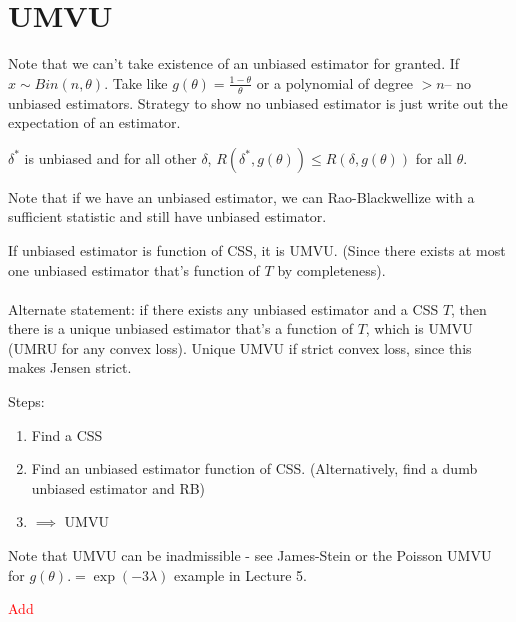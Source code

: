 \documentclass{article}
\newcommand\myworries[1]{\textcolor{red}{#1}}
\begin{document}
\section{UMVU}
Note that we can't take existence of an unbiased estimator for granted. If $x\sim Bin(n,\theta)$. Take like $g(\theta) = \frac{1-\theta}{\theta}$ or a polynomial of degree $>n$-- no unbiased estimators. Strategy to show no unbiased estimator is just write out the expectation of an estimator.
\begin{definition}[UMVU]
$\delta^*$ is unbiased and for all other $\delta$, $R(\delta^*,g(\theta)) \leq R(\delta,g(\theta))$ for all $\theta$.
\end{definition}
Note that if we have an unbiased estimator, we can Rao-Blackwellize with a sufficient statistic and still have unbiased estimator. 
\begin{theorem}
If unbiased estimator is function of CSS, it is UMVU. (Since there exists at most one unbiased estimator that's function of $T$ by completeness).\\\\
Alternate statement: if there exists any unbiased estimator and a CSS $T$, then there is a unique unbiased estimator that's a function of $T$, which is UMVU (UMRU for any convex loss). Unique UMVU if strict convex loss, since this makes Jensen strict. 

\end{theorem}
\begin{recipe}Steps:
	\begin{enumerate}
	\item Find a CSS
	\item Find an unbiased estimator function of CSS. (Alternatively, find a dumb unbiased estimator and RB)
	\item $\implies$ UMVU
\end{enumerate}
\end{recipe}
Note that UMVU can be inadmissible - see James-Stein or the Poisson UMVU for $g(\theta).= \exp(-3\lambda)$ example in Lecture 5. 
\begin{theorem}
\myworries{Add}
\end{theorem}
\end{document}
